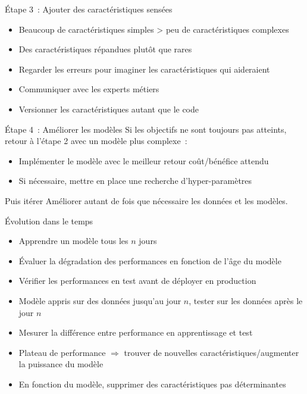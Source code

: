 \begin{frame}{Étape 3~: Ajouter des caractéristiques sensées}
  \begin{itemize}[<+->]
    \item Beaucoup de caractéristiques simples > peu de caractéristiques complexes
    \item Des caractéristiques répandues plutôt que rares
    \item Regarder les erreurs pour imaginer les caractéristiques qui aideraient
    \item Communiquer avec les experts métiers
    \item Versionner les caractéristiques autant que le code
  \end{itemize}
\end{frame}

\begin{frame}{Étape 4~: Améliorer les modèles}
  Si les objectifs ne sont toujours pas atteints, retour à l'étape 2 avec un modèle plus complexe~:

  \begin{itemize}[<+->]
    \item Implémenter le modèle avec le meilleur retour coût/bénéfice attendu
    \item Si nécessaire, mettre en place une recherche d'hyper-paramètres
  \end{itemize}
\end{frame}

\begin{frame}{Puis itérer}
  Améliorer autant de fois que nécessaire les données et les modèles.
\end{frame}

\begin{frame}{Évolution dans le temps}
  \begin{itemize}[<+->]
    \item Apprendre un modèle tous les $n$ jours
    \item Évaluer la dégradation des performances en fonction de l'âge du modèle
    \item Vérifier les performances en test avant de déployer en production
    \item Modèle appris sur des données jusqu'au jour $n$, tester sur les données après le jour $n$
    \item Mesurer la différence entre performance en apprentissage et test
    \item Plateau de performance $\Rightarrow$ trouver de nouvelles caractéristiques/augmenter la puissance du modèle
    \item En fonction du modèle, supprimer des caractéristiques pas déterminantes
  \end{itemize}
\end{frame}
